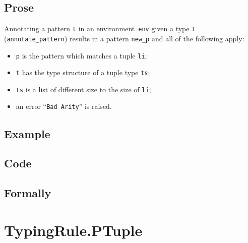 \documentclass{book}
\begin{document}
  \subsection{Prose}
   Annotating a pattern \texttt{t} in an environment~\texttt{env} given a type \texttt{t} (\texttt{annotate\_pattern}) results in a pattern \texttt{new\_p} and all of the following apply:
   \begin{itemize}
   \item \texttt{p} is the pattern which matches a tuple \texttt{li};
   \item \texttt{t} has the type structure of a tuple type \texttt{ts};
   \item \texttt{ts} is a list of different size to the size of \texttt{li};
   \item an error ``\texttt{Bad Arity}'' is raised. 
   \end{itemize}

  \subsection{Example}

  \subsection{Code}

\begin{emptyformal}
    \subsection{Formally}
\end{emptyformal}



\section{TypingRule.PTuple \label{sec:TypingRule.PTuple}}
\end{document}
